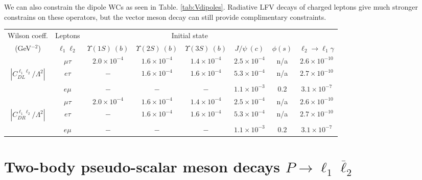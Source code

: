 \documentclass[12pt]{article}
\begin{document}
We can also constrain the dipole WCs as seen in Table. \ref{tab:Vdipoles}.  Radiative LFV decays of 
charged leptons give much stronger constrains on these operators, but the vector meson decay 
can still provide complimentary constraints.

\begin{table*}
\begin{center}
\footnotesize
\begin{tabular}{cccccccc}
\hline \hline
Wilson coeff. & Leptons &\multicolumn{5}{c}{Initial state} & \\
(GeV$^{-2}$) & $\ell_1 \ell_2$ & $\Upsilon(1S) \ (b)$ & $\Upsilon(2S) \ (b)$ & $\Upsilon(3S) \ (b)$ 
 & $J/\psi \ (c)$ & $\phi (s)$ & $\ell_2 \to \ell_1 \gamma$ \\ \hline
$~$ & $\mu \tau$ & $2.0 \times 10^{-4}$ & $1.6 \times 10^{-4}$ & $1.4 \times 10^{-4}$ 
 & $2.5 \times 10^{-4}$ & n/a & $2.6 \times 10^{-10}$ \\
%
$\left| C_{DL}^{\ell_1\ell_2}/\Lambda^2 \right|$ & $e \tau$ & $-$ & $1.6 \times 10^{-4}$ & $1.6 \times 10^{-4}$ 
 & $5.3 \times 10^{-4}$ & n/a & $2.7 \times 10^{-10}$ \\
%
$~$ & $e \mu$ & $-$ & $-$ & $-$  
& $1.1 \times 10^{-3}$ & $0.2$ & $3.1 \times 10^{-7}$ \\
\hline
$~$ & $\mu \tau$  & $2.0 \times 10^{-4}$ & $1.6 \times 10^{-4}$ & $1.4 \times 10^{-4}$ 
 & $2.5 \times 10^{-4}$ & n/a & $2.6 \times 10^{-10}$ \\
%
$\left| C_{DR}^{\ell_1\ell_2}/{\Lambda^2} \right|$ & $e \tau$ & $-$ & $1.6 \times 10^{-4}$ & $1.6 \times 10^{-4}$ 
 & $5.3 \times 10^{-4}$ & n/a & $2.7 \times 10^{-10}$ \\
%
$~$ & $e \mu$ & $-$ & $-$ & $-$ 
 & $1.1 \times 10^{-3}$ & $0.2$ & $3.1 \times 10^{-7}$ \\
\hline \hline
\end{tabular}
\end{center}
\caption{\label{tab:Vdipoles} Constraints on the dipole WCs from the $1^{--}$ quarkonium
decays and radiative lepton transitions $\ell_2 \to \ell_1 \gamma$. Dashes signify that 
no experimental data are available to produce a constraint; ``n/a" means that the transition is 
forbidden by phase space (from \cite{Hazard:2016fnc}).}
\end{table*}
%

\section{Two-body pseudo-scalar meson decays $P \to \ell_1 \overline \ell_2$}
\end{document}
